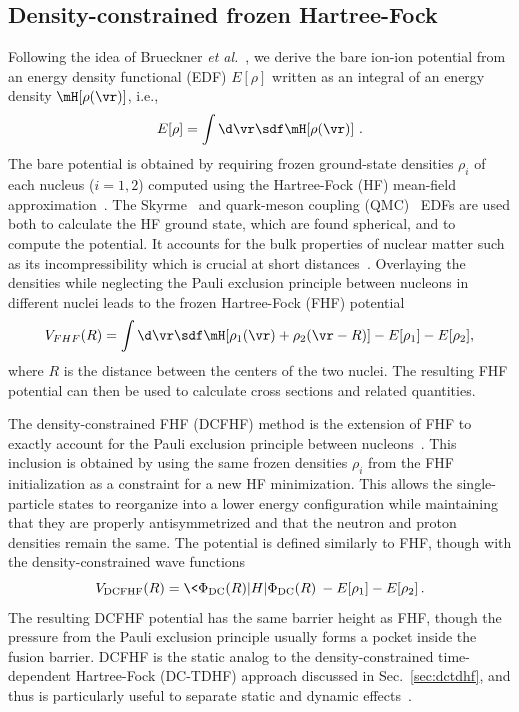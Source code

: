 \subsection{Density-constrained frozen Hartree-Fock}
\label{sec:dcfhf}
Following the idea of Brueckner \textit{et al.}~\protect\cite{brueckner1968}, we derive the bare ion-ion potential from an energy density functional (EDF)  $E[\rho]$
written as an integral of an energy density $\mH[\rho(\vr)]$, i.e.,
\begin{equation}
E[\rho]=\int \d\vr \sdf \mH[\rho(\vr)]~.
\end{equation}
The bare potential is obtained by requiring frozen ground-state densities $\rho_{i}$ of each nucleus ($i=1,2$) computed using the Hartree-Fock (HF) mean-field approximation~\protect\cite{hartree1928,fock1930}.
The Skyrme~\protect\cite{skyrme1956} and quark-meson coupling (QMC)~\protect\cite{stone2016} EDFs are used both to calculate the HF ground state, which are found spherical, and to compute the potential.
It accounts for the bulk properties of nuclear matter such as its incompressibility which is crucial at short distances~\protect\cite{brueckner1968,misicu2006,hossain2015}.
Overlaying the densities while neglecting the Pauli exclusion principle between nucleons in different nuclei
leads to the frozen Hartree-Fock (FHF) potential~\protect\cite{washiyama2008,simenel2008,simenel2012}
\begin{equation}
V_{FHF}(R)=\int \d\vr \sdf \mH[\rho_1(\vr)+\rho_2(\vr-R)] - E[\rho_1] -E[\rho_2],
\label{eq:frozen}
\end{equation}
where $R$ is the distance between the centers of the two nuclei.
The resulting FHF potential can then be used to calculate cross sections and related quantities.

The density-constrained FHF (DCFHF) method is the extension of FHF to exactly account for the Pauli exclusion principle between nucleons~\protect\cite{simenel2017}.
This inclusion is obtained by using the same frozen densities $\rho_{i}$ from the FHF initialization as a constraint for a new HF minimization.
This allows the single-particle states to reorganize into a lower energy configuration while maintaining that they are properly antisymmetrized and that the neutron and proton densities remain the same.
The potential is defined similarly to FHF, though with the density-constrained wave functions~\protect\cite{simenel2017}
\begin{equation}
V_{\mathrm{DCFHF}}(R)=\<\Phi_{\mathrm{DC}}(R) | H | \Phi_{\mathrm{DC}}(R) \>-E[\rho_1]-E[\rho_2]\,.
\label{eq:vr}
\end{equation}
The resulting DCFHF potential has the same barrier height as FHF, though the pressure from the Pauli exclusion principle usually forms a pocket inside the fusion barrier.
DCFHF is the static analog to the density-constrained time-dependent Hartree-Fock (DC-TDHF) approach discussed in Sec.~\ref{sec:dctdhf}, and thus is particularly useful to separate static and dynamic effects~\protect\cite{vophuoc2016}.

